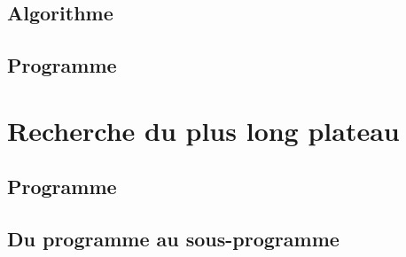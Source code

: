\documentclass{article}
\begin{document}
		\subsection{Algorithme}
				
		\subsection{Programme}	
				
	\section{Recherche du plus long plateau}
		\subsection{Programme}
			
		\subsection{Du programme au sous-programme}
			\subsubsection{}	
				
			\subsubsection{}	
				
			\subsubsection{}	
				
			\subsubsection{}	
				
				
\end{document}
